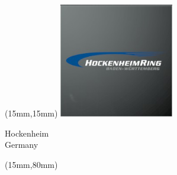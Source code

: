 \begin{textblock*}{50mm}(15mm,15mm)%
\includegraphics[width=50mm]{LG/2015-05-20_00082.png}
\par Hockenheim\\ Germany
\end{textblock*}
\begin{textblock*}{185mm}(15mm,80mm)%
\end{textblock*}
